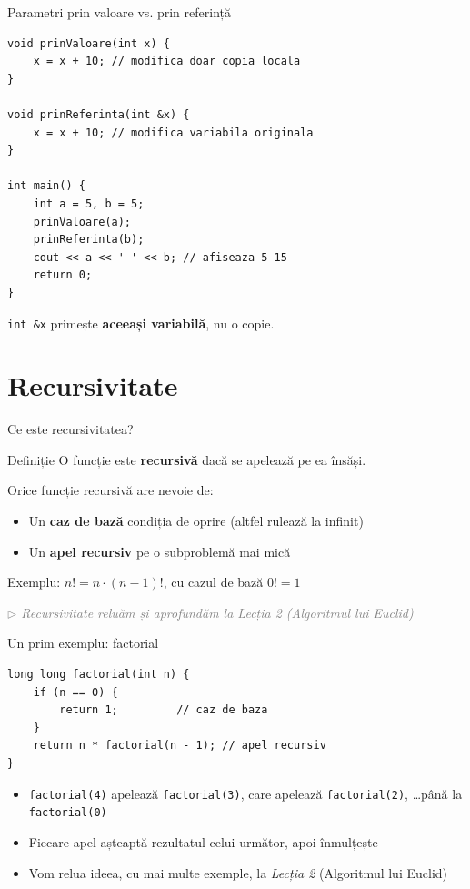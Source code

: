 \documentclass{beamer}
\begin{document}
\begin{frame}[fragile]{Parametri prin valoare vs. prin referință}
  \begin{lstlisting}
void prinValoare(int x) {
    x = x + 10; // modifica doar copia locala
}

void prinReferinta(int &x) {
    x = x + 10; // modifica variabila originala
}

int main() {
    int a = 5, b = 5;
    prinValoare(a);
    prinReferinta(b);
    cout << a << ' ' << b; // afiseaza 5 15
    return 0;
}
  \end{lstlisting}
  \lstinline|int &x| primește \textbf{aceeași variabilă}, nu o copie.
\end{frame}

\section{Recursivitate}

\begin{frame}{Ce este recursivitatea?}
  \begin{block}{Definiție}
    O funcție este \textbf{recursivă} dacă se apelează pe ea însăși.
  \end{block}

  \smallskip
  Orice funcție recursivă are nevoie de:
  \begin{itemize}
    \item Un \textbf{caz de bază} \textemdash{} condiția de oprire (altfel rulează la infinit)
    \item Un \textbf{apel recursiv} pe o subproblemă mai mică
  \end{itemize}

  \smallskip
  Exemplu: $n! = n \cdot (n-1)!$, cu cazul de bază $0! = 1$

  \vfill
  {\footnotesize\textcolor{gray}{\textit{$\triangleright$ Recursivitate \textemdash{} reluăm și aprofundăm la \emph{Lecția 2} (Algoritmul lui Euclid)}}}
\end{frame}

\begin{frame}[fragile]{Un prim exemplu: factorial}
  \begin{lstlisting}
long long factorial(int n) {
    if (n == 0) {
        return 1;         // caz de baza
    }
    return n * factorial(n - 1); // apel recursiv
}
  \end{lstlisting}
  \begin{itemize}
    \item \lstinline|factorial(4)| apelează \lstinline|factorial(3)|, care apelează \lstinline|factorial(2)|, \dots până la \lstinline|factorial(0)|
    \item Fiecare apel așteaptă rezultatul celui următor, apoi înmulțește
    \item Vom relua ideea, cu mai multe exemple, la \emph{Lecția 2} (Algoritmul lui Euclid)
  \end{itemize}
\end{frame}
\end{document}
